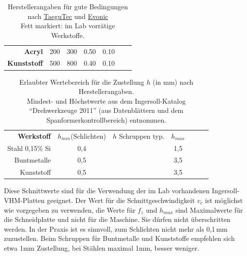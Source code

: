 \documentclass{\basedir/fablab-document}
\begin{document}
\begin{table}
\begin{tabular}{rcccccc}
	\textbf{Acryl}				   & 200	& 300 	& 0.50 	& 0.10\\
	\textbf{Kunststoff}			   & 500	& 800 	& 0.40 	& 0.10\\
\end{tabular}
\caption{Herstellerangaben für gute Bedingungen nach \href{http://www.taegutec.com/Ustyles/DownloadFiles/I_Grades_en.pdf}{TaeguTec} und \href{http://www.roehmschweiz.ch/fileadmin/Roehm/PDF_Plexiglas/311-1_Bearbeiten_von_PLEXIGLAS_de.pdf}{Evonic} \\Fett markiert: im Lab vorrätige Werkstoffe.}
\end{table}

\begin{table}
\centering
\setlength{\tabcolsep}{0.5em}

\begin{tabular}{rcccccc}
  \textbf{Werkstoff} & $h_{min}$(Schlichten) & $h$ Schruppen typ. & $h_{max}$ \\
  Stahl 0,15\% Si       & 0,4 & & 1,5\\
  Buntmetalle           & 0,5 & & 3,5\\
  Kunststoff            & 0,5 & & 3,5\\
\end{tabular}
\caption{Erlaubter Wertebereich für die Zustellung $h$ (in mm) nach Herstellerangaben. \\Mindest- und Höchstwerte aus dem Ingersoll-Katalog \enquote{Drehwerkzeuge 2011} (aus Datenblättern und dem Spanformerkontrollbereich) entnommen.}
\end{table} 

Diese Schnittwerte sind für die Verwendung der im Lab vorhandenen Ingersoll-VHM-Platten geeignet. Der Wert für die Schnittgeschwindigkeit $v_c$ ist möglichst wie vorgegeben zu verwenden, die Werte für $f_z$ und $h_{max}$ sind Maximalwerte für die Schneidplatte und nicht für die Maschine. Sie dürfen nicht überschritten werden. In der Praxis ist es sinnvoll, zum Schlichten nicht mehr als 0,1\,mm zuzustellen. Beim Schruppen für Buntmetalle und Kunststoffe empfehlen sich etwa 1mm Zustellung, bei Stählen maximal 1mm, besser weniger.\\
\end{document}
